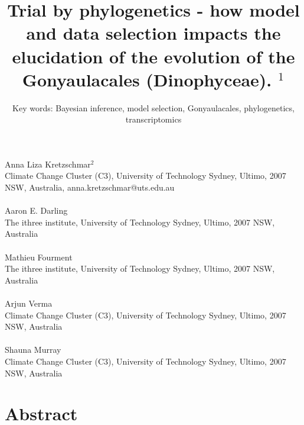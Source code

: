 \documentclass[12pt]{article}
\title{Trial by phylogenetics - how model and data selection impacts the elucidation of the evolution of the Gonyaulacales (Dinophyceae). $^{1}$}
\author{Key words: Bayesian inference, model selection, Gonyaulacales, phylogenetics, transcriptomics}
\date{}
\begin{document}
\maketitle


\paragraph{}Anna Liza Kretzschmar$^{2}$\\
Climate Change Cluster (C3), University of Technology Sydney, Ultimo, 2007 NSW, Australia, anna.kretzschmar@uts.edu.au
\paragraph{}Aaron E. Darling \\
The ithree institute, University of Technology Sydney, Ultimo, 2007 NSW, Australia
\paragraph{}Mathieu Fourment \\
The ithree institute, University of Technology Sydney, Ultimo, 2007 NSW, Australia
\paragraph{}Arjun Verma\\
Climate Change Cluster (C3), University of Technology Sydney, Ultimo, 2007 NSW, Australia
\paragraph{}Shauna Murray\\ 
Climate Change Cluster (C3), University of Technology Sydney, Ultimo, 2007 NSW, Australia
\newpage
\section{Abstract}
\newpage
\end{document}
